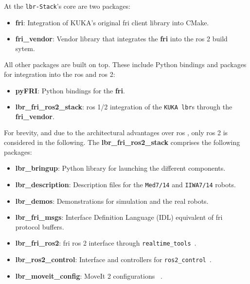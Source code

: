 At the \texttt{\acrshort{lbr}-Stack}'s core are two packages:

\begin{itemize}
\item
  \textbf{fri}: Integration of KUKA's original \acrshort{fri} client library into
  CMake.
\item
  \textbf{fri\_vendor}: Vendor library that integrates the \textbf{fri}
  into the \acrshort{ros} 2 build sytem.
\end{itemize}

All other packages are built on top. These include Python bindings and
packages for integration into the \acrfull{ros} and \acrshort{ros}
2:

\begin{itemize}
\item
  \textbf{pyFRI}: Python bindings for the \textbf{fri}.
\item
  \textbf{lbr\_fri\_ros2\_stack}: \acrshort{ros} 1/2 integration of the
  \texttt{KUKA\ \acrshort{lbr}}s through the \textbf{fri\_vendor}.
\end{itemize}

For brevity, and due to the architectural advantages over \acrshort{ros}
\cite{ref-ros2}, only \acrshort{ros} 2 is
considered in the following. The \textbf{lbr\_fri\_ros2\_stack}
comprises the following packages:

\begin{itemize}
\item
  \textbf{lbr\_bringup}: Python library for launching the different
  components.
\item
  \textbf{lbr\_description}: Description files for the \texttt{Med7/14}
  and \texttt{IIWA7/14} robots.
\item
  \textbf{lbr\_demos}: Demonstrations for simulation and the real
  robots.
\item
  \textbf{lbr\_fri\_msgs}: Interface Definition Language (IDL)
  equivalent of \acrshort{fri} protocol buffers.
\item
  \textbf{lbr\_fri\_ros2}: \acrshort{fri} \acrshort{ros} 2 interface through
  \texttt{realtime\_tools}~\cite{ref-ros_control}.
\item
  \textbf{lbr\_ros2\_control}: Interface and controllers for
  \texttt{ros2\_control}~\cite{ref-ros2_control}.
\item
  \textbf{lbr\_moveit\_config}: MoveIt 2 configurations
 ~\cite{ref-moveit}.
\end{itemize}

